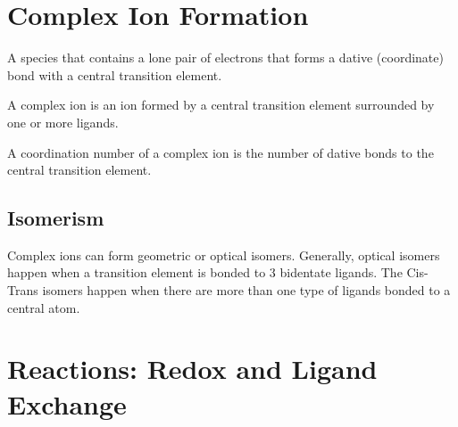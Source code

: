 \documentclass{article}
\theoremstyle{mytheoremstyle}
\theoremstyle{mytheoremstyle}
\theoremstyle{myproblemstyle}
\begin{document}
    \section{Complex Ion Formation}
    \begin{definition}[Ligands]
        A species that contains a lone pair of electrons that forms a dative (coordinate) bond with a central transition element.
    \end{definition}

    \begin{definition}
        A complex ion is an ion formed by a central transition element surrounded by one or more ligands.
    \end{definition}

    \begin{definition}
        A coordination number of a complex ion is the number of dative bonds to the central transition element.
    \end{definition}

    \subsection{Isomerism}
    Complex ions can form geometric or optical isomers. Generally, optical isomers happen when a transition element is bonded to 3 bidentate ligands. The Cis-Trans isomers happen when there are more than one type of ligands bonded to a central atom.


    \section{Reactions: Redox and Ligand Exchange}
\end{document}
